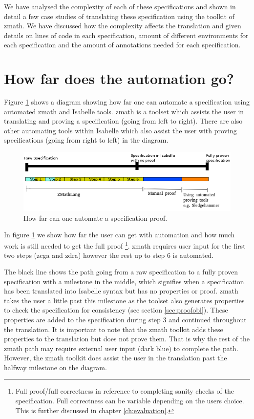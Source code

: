 We have analysed the complexity of each of these specifications and shown in
detail a few case studies of translating these specification using the toolkit
of \gls{zmath}. We have discussed how the complexity affects the translation and
given details on lines of code in each specification, amount of different
environments for each specification and the amount of annotations needed for
each specification.

\section{How far does the automation go?}

Figure \ref{fig:timeline} shows a diagram showing how far one can automate a
specification using automated \gls{zmath} and Isabelle tools. \Gls{zmath} is a
toolset which assists the user in translating and proving a specification (going
from left to right). There are also other automating tools within Isabelle which
also assist the user with proving specifications (going from right to left) in
the diagram.

\begin{figure}[H]
 \begin{center}
 \includegraphics [scale=0.75]{Figures/Design/timeline2.png}
 \caption{How far can one automate a specification proof.}
 \label{fig:timeline}
\end{center}
\end{figure} 

In figure \ref{fig:timeline} we show how far the user can get with automation
and how much work is still needed to get the full proof \footnote{Full
proof/full correctness in reference to completing sanity checks of the
specification. Full correctness can be variable depending on the users choice.
This is further discussed in chapter \ref{ch:evaluation}.}. \Gls{zmath} requires
user input for the first two steps (\gls{zcga} and \gls{zdra}) however the rest
up to step 6 is automated.

The black line shows the path going from a raw specification to a fully proven
specification with a milestone in the middle, which signifies when a
specification has been translated into Isabelle syntax but has no properties or
proof. \Gls{zmath} takes the user a little past this milestone as the toolset
also generates properties to check the specification for consistency (see
section \ref{sec:proofobl}). These properties are added to the specification
during step 3 and continued throughout the translation. It is important to note
that the \gls{zmath} toolkit adds these properties to the translation but does
not prove them. That is why the rest of the \gls{zmath} path may require
external user input (dark blue) to complete the path. However, the \gls{zmath}
toolkit does assist the user in the translation past the halfway milestone on
the diagram.

